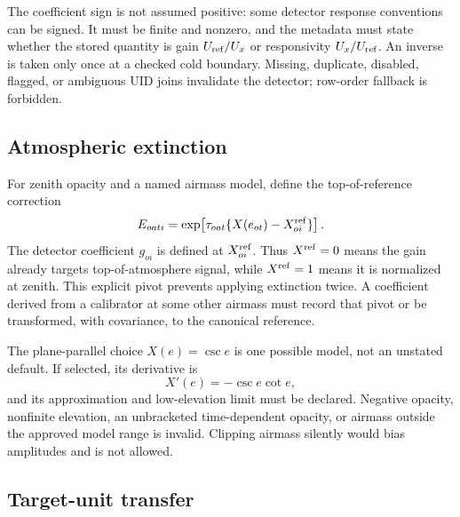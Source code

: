 \documentclass[11pt]{article}
\begin{document}
The coefficient sign is not assumed positive: some detector response
conventions can be signed.  It must be finite and nonzero, and the metadata
must state whether the stored quantity is gain \(U_{\rm ref}/U_x\) or
responsivity \(U_x/U_{\rm ref}\).  An inverse is taken only once at a checked
cold boundary.  Missing, duplicate, disabled, flagged, or ambiguous UID joins
invalidate the detector; row-order fallback is forbidden.

\subsection{Atmospheric extinction}

For zenith opacity and a named airmass model, define the top-of-reference
correction
\begin{equation}
  E_{oati}=
  \exp\!\left[\tau_{oat}\{X(e_{ot})-X^{\rm ref}_{oi}\}\right].
  \label{eq:extinction}
\end{equation}
The detector coefficient \(g_{oi}\) is defined at \(X^{\rm ref}_{oi}\).  Thus
\(X^{\rm ref}=0\) means the gain already targets top-of-atmosphere signal,
while \(X^{\rm ref}=1\) means it is normalized at zenith.  This explicit pivot
prevents applying extinction twice.  A coefficient derived from a calibrator
at some other airmass must record that pivot or be transformed, with
covariance, to the canonical reference.

The plane-parallel choice \(X(e)=\csc e\) is one possible model, not an
unstated default.  If selected, its derivative is
\begin{equation}
  X'(e)=-\csc e\cot e,
  \label{eq:airmass-derivative}
\end{equation}
and its approximation and low-elevation limit must be declared.  Negative
opacity, nonfinite elevation, an unbracketed time-dependent opacity, or airmass
outside the approved model range is invalid.  Clipping airmass silently would
bias amplitudes and is not allowed.

\subsection{Target-unit transfer}
\end{document}
